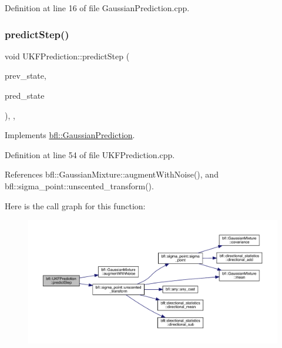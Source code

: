 Definition at line 16 of file Gaussian\+Prediction.\+cpp.

\mbox{\label{classbfl_1_1UKFPrediction_a0ffba56fa1aa4d71c6872e1d76bd2f02}} 
\subsubsection{\texorpdfstring{predict\+Step()}{predictStep()}}
{\footnotesize\ttfamily void U\+K\+F\+Prediction\+::predict\+Step (\begin{DoxyParamCaption}\item[{const \mbox{\hyperlink{classbfl_1_1GaussianMixture}{bfl\+::\+Gaussian\+Mixture}} \&}]{prev\+\_\+state,  }\item[{\mbox{\hyperlink{classbfl_1_1GaussianMixture}{bfl\+::\+Gaussian\+Mixture}} \&}]{pred\+\_\+state }\end{DoxyParamCaption})\hspace{0.3cm}{\ttfamily [override]}, {\ttfamily [protected]}, {\ttfamily [virtual]}}



Implements \mbox{\hyperlink{classbfl_1_1GaussianPrediction_a35e7c490378c9bb48e4becad7fdcb2a1}{bfl\+::\+Gaussian\+Prediction}}.



Definition at line 54 of file U\+K\+F\+Prediction.\+cpp.



References bfl\+::\+Gaussian\+Mixture\+::augment\+With\+Noise(), and bfl\+::sigma\+\_\+point\+::unscented\+\_\+transform().

Here is the call graph for this function\+:
\nopagebreak
\begin{figure}[H]
\begin{center}
\leavevmode
\includegraphics[width=350pt]{classbfl_1_1UKFPrediction_a0ffba56fa1aa4d71c6872e1d76bd2f02_cgraph}
\end{center}
\end{figure}
\mbox{\label{classbfl_1_1UKFPrediction_a9d1beaa2cb50ca2e006c9a68f9a8499a}} 
